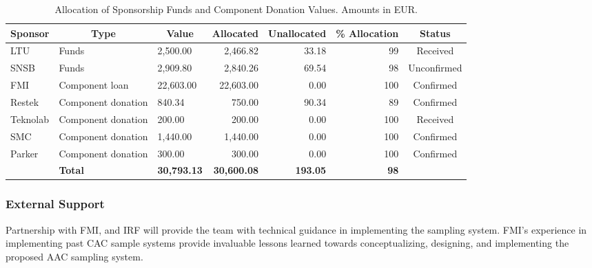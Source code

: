 \documentclass[a4paper,12pt,twoside]{article}
\begin{document}
\begin{table}[H]
\centering
\begin{tabular}{l|m{}|l|r|r|r|c}
\hline
\multicolumn{1}{|l|}{\textbf{Sponsor}} & \multicolumn{1}{|c|}{\textbf{Type}} & \multicolumn{1}{c|}{\textbf{Value}} & \multicolumn{1}{c|}{\textbf{Allocated}} & \multicolumn{1}{c|}{\textbf{Unallocated}} & \multicolumn{1}{c|}{\textbf{\% Allocation}} & \multicolumn{1}{c|}{\textbf{Status}} \\ \hline
\multicolumn{1}{|l|}{LTU} & Funds & 2,500.00 & 2,466.82 & 33.18 & 99 & \multicolumn{1}{c|}{Received} \\ \hline
\multicolumn{1}{|l|}{SNSB} & Funds & 2,909.80 & 2,840.26 & 69.54 & 98 & \multicolumn{1}{c|}{Unconfirmed} \\ \hline
\multicolumn{1}{|l|}{FMI} & Component loan & 22,603.00 & 22,603.00 & 0.00 & 100 & \multicolumn{1}{c|}{Confirmed} \\ \hline
\multicolumn{1}{|l|}{Restek} & Component donation & 840.34 & 750.00 & 90.34 & 89 & \multicolumn{1}{c|}{Confirmed} \\ \hline
\multicolumn{1}{|l|}{Teknolab} & Component donation & 200.00 & 200.00 & 0.00 & 100 & \multicolumn{1}{c|}{Received} \\ \hline
\multicolumn{1}{|l|}{SMC} & Component donation & 1,440.00 & 1,440.00 & 0.00 & 100 & \multicolumn{1}{c|}{Confirmed} \\ \hline
\multicolumn{1}{|l|}{Parker} & Component donation & 300.00 & 300.00 & 0.00 & 100 & \multicolumn{1}{c|}{Confirmed} \\ \hline
 & \multicolumn{1}{l|}{\textbf{Total}} & \textbf{30,793.13} & \textbf{30,600.08} & \textbf{193.05} & \textbf{98} & \multicolumn{1}{l}{} \\ \cline{2-6}
\end{tabular}
\caption{Allocation of Sponsorship Funds and Component Donation Values. Amounts in EUR.}
\label{table:sponsroship-allocation}
\end{table}


\subsubsection{External Support}

Partnership with FMI, and IRF will provide the team with technical guidance in implementing the sampling system. FMI’s experience in implementing past CAC sample systems provide invaluable lessons learned towards conceptualizing, designing, and implementing the proposed AAC sampling system.
\end{document}
